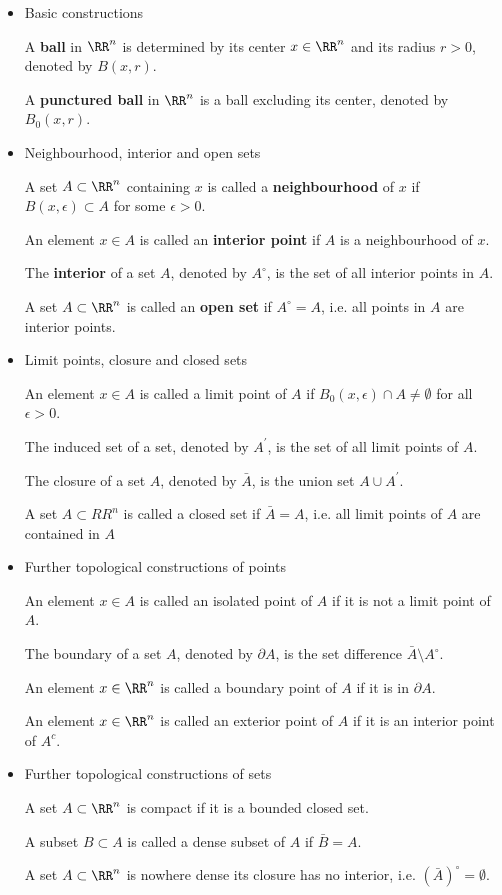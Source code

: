 \begin{itemize}
\item Basic constructions

A \textbf{ball} in $\RR^n$ is determined by its center $x\in\RR^n$ and its radius $r>0$, denoted by $B(x,r)$.

A \textbf{punctured ball} in $\RR^n$ is a ball excluding its center, denoted by $B_0(x,r)$.

\item Neighbourhood, interior and open sets

A set $A\subset\RR^n$ containing $x$ is called a \textbf{neighbourhood} of $x$ if $B(x,\epsilon)\subset A$ for some $\epsilon>0$.

An element $x\in A$ is called an \textbf{interior point} if $A$ is a neighbourhood of $x$.

The \textbf{interior} of a set $A$, denoted by $A^\circ$, is the set of all interior points in $A$.

A set $A\subset\RR^n$ is called an \textbf{open set} if $A^\circ=A$, i.e. all points in $A$ are interior points.

\item Limit points, closure and closed sets

An element $x\in A$ is called a limit point of $A$ if $B_0(x,\epsilon)\cap A\neq\emptyset$ for all $\epsilon>0$.

The induced set of a set, denoted by $A^\prime$, is the set of all limit points of $A$.

The closure of a set $A$, denoted by $\bar{A}$, is the union set $A\cup A^\prime$.

A set $A\subset RR^n$ is called a closed set if $\bar{A}=A$, i.e. all limit points of $A$ are contained in $A$

\item Further topological constructions of points

An element $x\in A$ is called an isolated point of $A$ if it is not a limit point of $A$.

The boundary of a set $A$, denoted by $\partial A$, is the set difference $\bar{A}\setminus A^\circ$.

An element $x\in\RR^n$ is called a boundary point of $A$ if it is in $\partial A$.

An element $x\in\RR^n$ is called an exterior point of $A$ if it is an interior point of $A^c$.

\item Further topological constructions of sets

A set $A\subset\RR^n$ is compact if it is a bounded closed set.

A subset $B\subset A$ is called a dense subset of $A$ if $\bar{B}=A$.

A set $A\subset\RR^n$ is nowhere dense its closure has no interior, i.e. $(\bar{A})^\circ=\emptyset$.
\end{itemize}

